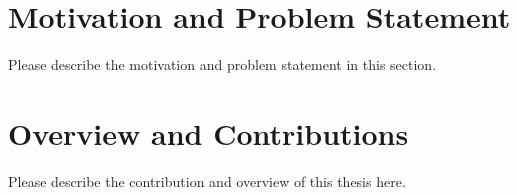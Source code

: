 






\section{Motivation and Problem Statement}
\label{sec::dissertation-motivation}

Please describe the motivation and problem statement in this section. \lipsum[3-4]

\section{Overview and Contributions}
\label{sec::dissertation-contributions}
Please describe the contribution and overview of this thesis here. \lipsum[5-6]
